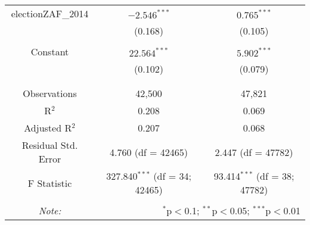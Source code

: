 \documentclass[12pt, titlepage]{article}
\begin{document}
\begin{longtable}[H]{ccc }
		electionZAF\_2014 & $-2.546^{***}$ & $0.765^{***}$ \\ 
		& (0.168) & (0.105) \\ 
		& & \\ 
		Constant & $22.564^{***}$ & $5.902^{***}$ \\ 
		& (0.102) & (0.079) \\ 
		& & \\ 
		\hline \\[-1.8ex] 
		Observations & \multicolumn{1}{c}{42,500} & \multicolumn{1}{c}{47,821} \\ 
		R$^{2}$ & \multicolumn{1}{c}{0.208} & \multicolumn{1}{c}{0.069} \\ 
		Adjusted R$^{2}$ & \multicolumn{1}{c}{0.207} & \multicolumn{1}{c}{0.068} \\ 
		Residual Std. Error & \multicolumn{1}{c}{4.760 (df = 42465)} & \multicolumn{1}{c}{2.447 (df = 47782)} \\ 
		F Statistic & \multicolumn{1}{c}{327.840$^{***}$ (df = 34; 42465)} & \multicolumn{1}{c}{93.414$^{***}$ (df = 38; 47782)} \\ 
		\hline 
		\hline \\[-1.8ex] 
		\textit{Note:}  & \multicolumn{2}{r}{$^{*}$p$<$0.1; $^{**}$p$<$0.05; $^{***}$p$<$0.01} \\ 
	\end{longtable} 
\end{document}
